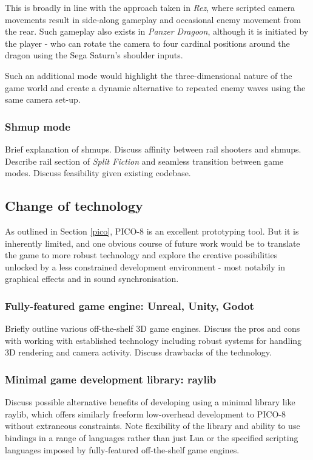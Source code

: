 \documentclass[11pt]{article}
\begin{document}
This is broadly in line with the approach taken in \textit{Rez}, where scripted camera movements
result in side-along gameplay and occasional enemy movement from the rear. Such gameplay also
exists in \textit{Panzer Dragoon}, although it is initiated by the player - who can rotate the
camera to four cardinal positions around the dragon using the Sega Saturn's shoulder inputs.

Such an additional mode would highlight the three-dimensional nature of the game world and
create a dynamic alternative to repeated enemy waves using the same camera set-up.

\subsubsection*{Shmup mode}
Brief explanation of shmups. Discuss affinity between rail shooters and shmups. Describe rail section
of \textit{Split Fiction} and seamless transition between game modes. Discuss feasibility given
existing codebase.

\subsection{Change of technology}\label{engines}

As outlined in Section \ref{pico}, PICO-8 is an excellent prototyping tool. But it is inherently
limited, and one obvious course of future work would be to translate the game to more robust technology
and explore the creative possibilities unlocked by a less constrained development environment - most
notabily in graphical effects and in sound synchronisation.

\subsubsection*{Fully-featured game engine: Unreal, Unity, Godot}
Briefly outline various off-the-shelf 3D game engines. Discuss the pros and cons with working with
established technology including robust systems for handling 3D rendering and camera activity. Discuss
drawbacks of the technology. 

\subsubsection*{Minimal game development library: raylib}
Discuss possible alternative benefits of developing using a minimal library like raylib,
which offers similarly freeform low-overhead development to PICO-8 without extraneous
constraints. Note flexibility of the library and ability to use bindings in a range of
languages rather than just Lua or the specified scripting languages imposed by fully-featured
off-the-shelf game engines.
\end{document}
